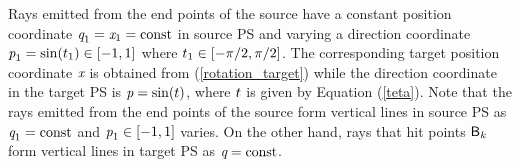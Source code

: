 Rays emitted from the end points of the source have a constant position coordinate $\textit{q}_1 = \textit{x}_1 = \textrm{const}$ in source PS and varying a direction coordinate $\textit{p}_1 = \sin(t_1)\in[-1, 1]$ where $t_1\in[-\pi/2, \pi/2]$. The corresponding target position coordinate $\textit{x}$ is obtained from (\ref{rotation_target}) while the direction coordinate in the target PS is $\textit{p} = \sin(t)$, where $t$ is given by Equation (\ref{teta}).
Note that the rays emitted from the end points of the source form vertical lines in source PS as $\textit{q}_1= \textrm{const}$ and $\textit{p}_1\in[-1,1]$ varies.
On the other hand, rays that hit points $\textsf{B}_k$ form vertical lines in target PS as $\textit{q} = \textrm{const}$.
\\ \indent 
%
